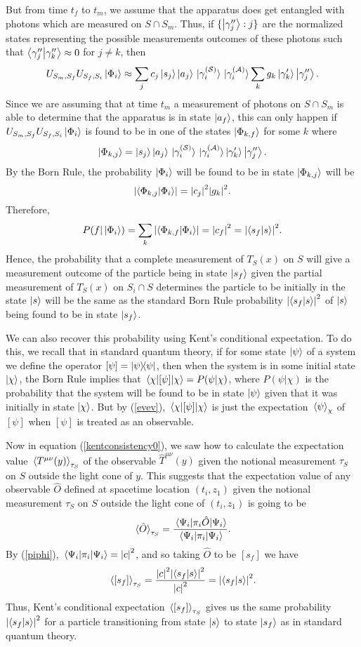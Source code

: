 But from time $t_f$ to $t_m$, we assume that the apparatus does get entangled with photons which are measured on $S\cap S_m$. Thus, if $\{\ket{\gamma_j^{\prime\prime}}:j\}$ are the normalized states representing the possible measurements outcomes of these photons such that $\ip{\gamma_j^{\prime\prime}}{\gamma_k^{\prime\prime}}\approx 0$ for $j\neq k$, then 
$$U_{S_m,S_f} U_{S_f,S_i}\ket{\Phi_{i}}\approx \sum_j c_j\ket{s_j}\ket{a_j}\ket*{\gamma_i^{(\mathcal{S})}}\ket*{\gamma_i^{(\mathcal{A})}}\sum_kg_k\ket{\gamma'_k}\ket{\gamma_j^{\prime\prime}}.$$
Since we are assuming that at time $t_m$ a measurement of photons on $S\cap S_m$ is able to determine that the apparatus is in state $\ket{a_f}$, this can only happen if $U_{S_m,S_f} U_{S_f,S_i}\ket{\Phi_{i}}$ is found to be in one of the states $\ket{\Phi_{k,f}}$ for some $k$ where
$$\ket{\Phi_{k,j}}=\ket{s_j}\ket{a_j}\ket*{\gamma_i^{(\mathcal{S})}}\ket*{\gamma_i^{(\mathcal{A})}}\ket{\gamma'_k}\ket{\gamma_j^{\prime\prime}}.$$
By the Born Rule, the probability $\ket{\Phi_i}$ will be found to be in state $\ket{\Phi_{k,j}}$ will be
$$\abs{\ip{\Phi_{k,j}}{\Phi_i}}=\abs{c_j}^2\abs{g_k}^2.$$
Therefore,
$$P(f|\ket{\Phi_i})=\sum_k \abs{\ip{\Phi_{k,f}}{\Phi_i}}=\abs{c_f}^2=\abs{\ip{s_f}{s}}^2.$$
Hence, the probability that a complete measurement of $T_S(x)$ on $S$ will give a measurement outcome of the particle being in state $\ket{s_f}$ given the partial measurement of $T_S(x)$ on $S_i\cap S$ determines the particle to be initially in the state $\ket{s}$ will be the same as the standard Born Rule probability $\abs{\ip{s_f}{s}}^2$ of $\ket{s}$ being found to be in state $\ket{s_f}$.

We can also recover this probability using Kent's conditional expectation. To do this, we recall that in standard quantum theory, if for some state $\ket{\psi}$ of a system we define the operator $[\psi]=\dyad{\psi}$, then when the system is in some initial state $\ket{\chi}$, the Born Rule implies that $\ev{[\psi]}{\chi}=P(\psi|\chi)$, where $P(\psi|\chi)$ is the probability that the system will be found to be in state $\ket{\psi}$ given that it was initially in state $\ket{\chi}$. But by (\ref{evev}),  $\ev{[\psi]}{\chi}$ is just the expectation $\ev*{\psi}_\chi$ of $[\psi]$ when $[\psi]$ is treated as an observable. 

Now in equation (\ref{kentconsistency0}), we saw how to calculate the expectation value $\ev*{T^{\mu\nu}(y)}_{\tau_S}$ of the observable $\hat{T}^{\mu\nu}(y)$ given the notional measurement $\tau_S$ on $S$ outside the light cone of $y$. This suggests that the expectation value of any observable $\hat{O}$ defined at spacetime location $(t_i,z_1)$ given the notional measurement $\tau_S$ on $S$ outside the light cone of $(t_i,z_1)$ is going to be
$$\ev*{\hat{O}}_{\tau_S}=\frac{\ev*{\pi_i\hat{O}}{\Psi_i}}{\ev*{\pi_i}{\Psi_i}}.$$ 
By (\ref{piphi}), $\ev*{\pi_i}{\Psi_i}=\abs{c}^2$, and so taking $\hat{O}$ to be $[s_f]$ we have 
$$ \ev*{[s_f]}_{\tau_S}=\frac{\abs{c}^2\abs{\ip{s_f}{s}}^2}{\abs{c}^2}=\abs{\ip{s_f}{s}}^2.$$
Thus, Kent's conditional expectation $\ev*{[s_f]}_{\tau_S}$ gives us the same probability $\abs{\ip{s_f}{s}}^2$ for a particle transitioning from state $\ket{s}$ to state $\ket{s_f}$ as in standard quantum theory.

